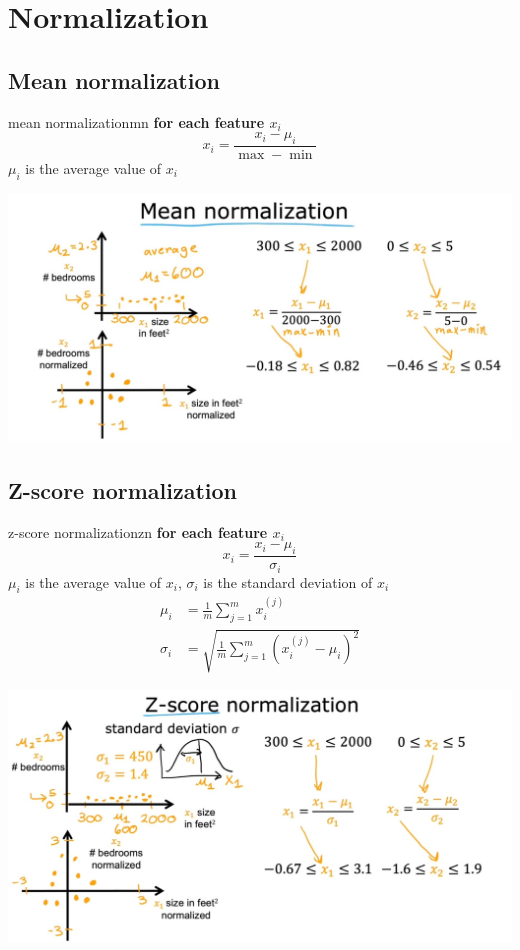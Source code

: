 \section{Normalization}

\subsection*{Mean normalization}
\begin{thmbox}{mean normalization}{mn}
\textbf{for each feature $x_i$}
\begin{equation}
    x_i = \frac{{x_i} - \mu_i}{\max - \min}
\end{equation}
$\mu_i$ is the average value of $x_i$
\end{thmbox}
\noindent
\includegraphics*[width=\textwidth]{images/2.4 (5)}

\subsection*{Z-score normalization}
\begin{thmbox}{z-score normalization}{zn}
\textbf{for each feature $x_i$}
\begin{equation}
    x_i = \frac{{x_i} - \mu_i}{\sigma_i}
\end{equation}
$\mu_i$ is the average value of $x_i$, $\sigma_i$ is the standard deviation of $x_i$
\begin{align*}
    \mu_i &= \frac{1}{m} \sum_{j=1}^{m} x_i^{(j)} \\
    \sigma_i &= \sqrt{\frac{1}{m} \sum_{j=1}^{m} (x_i^{(j)} - \mu_i)^2}
\end{align*}
\end{thmbox}
\noindent
\includegraphics*[width=\textwidth]{images/2.4 (6)}

